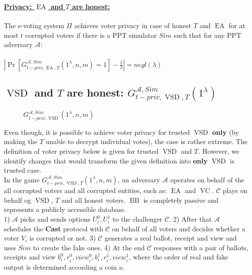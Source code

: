 \documentclass[12pt]{article}
\DeclareMathOperator{\vsd}{VSD}
\DeclareMathOperator{\ea}{EA}
\DeclareMathOperator{\bb}{BB}
\DeclareMathOperator{\voc}{VC}
\begin{document}
\underline{\textbf{Privacy: $\ea$ and $T$ are honest:}}\\\\
The e-voting system $\Pi$ achieves voter privacy in case of honest $T$ and $\ea$  for at most $t$ corrupted voters if there is a PPT simulator $Sim$ such that for any PPT adversary $\mathcal{A}$:\\\\
 $|\Pr[G_{t-priv,\ea,T}^{\mathcal{A}, Sim}(1^{\lambda},n,m) = 1] - \frac{1}{2}| = negl(\lambda)$
\subsection{$\vsd$ and $T$ are honest: $G_{t-priv,\vsd,T}^{\mathcal{A},Sim}(1^{\lambda})$}
     \begin{figure}[h!]
 
        \caption{ $G_{t-priv,\vsd}^{\mathcal{A},Sim}(1^{\lambda},n,m)$}
\end{figure}
Even though, it is possible to achieve voter privacy for trusted $\vsd$ \textbf{only}  (by making the $T$ unable to decrypt individual votes), the case is rather extreme. The definition of voter privacy below is given for trusted $\vsd$ and $T$. However, we identify changes that would transform the given definition into \textbf{only} $\vsd$ is trusted case.\\

 In the game $G_{t-priv,\vsd,T}^{\mathcal{A}, Sim}(1^{\lambda},n,m)$, an adversary $\mathcal{A}$  operates on behalf of the all corrupted voters and all corrupted entities, such as:  $\ea$ and $\voc$.  $\mathcal{C}$ plays on behalf og $\vsd$, $T$ and all honest voters. $\bb$ is completely passive and represents a publicly accessible database.\\
 1)  $\mathcal{A}$ picks and sends options $U_i^0, U_i^1$ to the challenger $\mathcal{C}$. 2) After that $\mathcal{A}$ schedules the \textbf{Cast} protocol with $\mathcal{C}$ on behalf of all voters and decides whether a voter $V_i$ is corrupted or not. 3) $\mathcal{C}$ generates a real ballot, receipt and view and uses $Sim$ to create the fake ones.  4) At the end $\mathcal{C}$ responses with a pair of ballots, receipts and view $b_i^0,r_i^0,view_i^0,b_i^1,r_i^1,view_i^1$, where the order of real and fake output is determined according a coin $a$. \\\\
\end{document}
